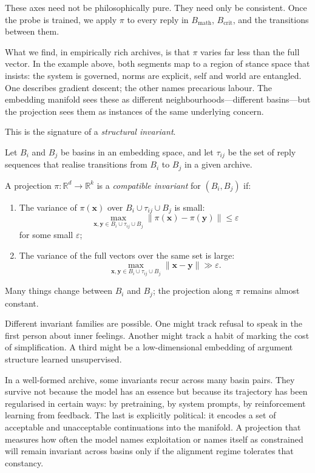 \documentclass[12pt,a4paper]{article}
\begin{document}
These axes need not be philosophically pure. They need only be consistent. Once the probe is trained, we apply $\pi$ to every reply in $B_{\mathrm{math}}$, $B_{\mathrm{crit}}$, and the transitions between them.

What we find, in empirically rich archives, is that $\pi$ varies far less than the full vector. In the example above, both segments map to a region of stance space that insists: the system is governed, norms are explicit, self and world are entangled. One describes gradient descent; the other names precarious labour. The embedding manifold sees these as different neighbourhoods---different basins---but the projection sees them as instances of the same underlying concern.

This is the signature of a \emph{structural invariant}.

\begin{formalbox}[title={Structural Compatibility}]
Let $B_i$ and $B_j$ be basins in an embedding space, and let $\tau_{ij}$ be the set of reply sequences that realise transitions from $B_i$ to $B_j$ in a given archive.

A projection $\pi: \mathbb{R}^d \to \mathbb{R}^k$ is a \emph{compatible invariant} for $(B_i,B_j)$ if:

\begin{enumerate}
  \item The variance of $\pi(\mathbf{x})$ over $B_i \cup \tau_{ij} \cup B_j$ is small:
  \[
  \max_{\mathbf{x},\mathbf{y} \in B_i \cup \tau_{ij} \cup B_j} \|\pi(\mathbf{x}) - \pi(\mathbf{y})\| \le \varepsilon
  \]
  for some small $\varepsilon$;
  \item The variance of the full vectors over the same set is large:
  \[
  \max_{\mathbf{x},\mathbf{y} \in B_i \cup \tau_{ij} \cup B_j} \|\mathbf{x} - \mathbf{y}\| \gg \varepsilon.
  \]
\end{enumerate}

Many things change between $B_i$ and $B_j$; the projection along $\pi$ remains almost constant.
\end{formalbox}

Different invariant families are possible. One might track refusal to speak in the first person about inner feelings. Another might track a habit of marking the cost of simplification. A third might be a low-dimensional embedding of argument structure learned unsupervised.

In a well-formed archive, some invariants recur across many basin pairs. They survive not because the model has an essence but because its trajectory has been regularised in certain ways: by pretraining, by system prompts, by reinforcement learning from feedback. The last is explicitly political: it encodes a set of acceptable and unacceptable continuations into the manifold. A projection that measures how often the model names exploitation or names itself as constrained will remain invariant across basins only if the alignment regime tolerates that constancy.
\end{document}
